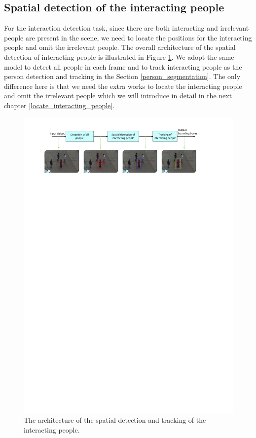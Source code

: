 \subsection{Spatial detection of the interacting people}
For the interaction detection task, since there are both interacting and irrelevant people are present in the scene, we need to locate the positions for the interacting people and omit the irrelevant people. The overall architecture of the spatial detection of interacting people is illustrated in Figure \ref{fig:ip_det}. We adopt the same model to detect all people in each frame and to track interacting people as the person detection and tracking in the Section \ref{person_segmentation}. The only difference here is that we need the extra works to locate the interacting people and omit the irrelevant people which we will introduce in detail in the next chapter \ref{locate_interacting_people}.  
\begin{figure}
	\includegraphics[trim=2cm 24cm 0cm 1cm]{fig01/ip_det.pdf}
	\caption{The architecture of the spatial detection  and tracking of the interacting people. }
	\label{fig:ip_det}
\end{figure}

